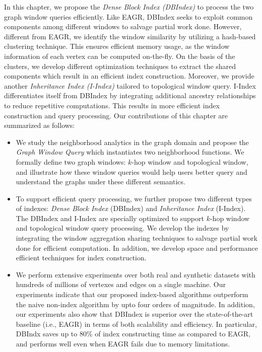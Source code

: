 In this chapter,
we propose the \emph{Dense Block Index (DBIndex)} 
to process the two graph window queries efficiently.
Like EAGR, DBIndex seeks to exploit common
components among different windows to salvage 
partial work done. However, different from EAGR,
we identify the window similarity by utilizing a hash-based 
clustering technique. This ensures 
efficient memory usage, as the window information of each vertex can 
be computed on-the-fly. On the basis of the clusters, we develop different 
optimization techniques to extract the shared components
which result in an efficient index construction. 
%
Moreover, we provide another \emph{Inheritance Index (I-Index)} tailored 
to topological window query. I-Index differentiates itself from
DBIndex by integrating additional ancestry relationships 
to reduce repetitive computations. This results in 
more efficient index construction and query processing.  
%
Our contributions of this chapter are summarized as follows:
\begin{itemize}
\item{We study the neighborhood analytics in the graph domain and propose the
\emph{Graph Window Query} which instantiates two neighborhood functions.
We formally define two graph windows: $k$-hop window and topological window, 
and illustrate how these window queries would help users better query and
understand the graphs under these different semantics.}

\item{To support efficient query processing, we further propose two different types of indexes: \emph{Dense Block Index} (DBIndex) and \emph{Inheritance Index} (I-Index). The
DBIndex and I-Index are specially 
optimized to support $k$-hop window and topological window query processing. 
We develop the indexes by integrating the window aggregation sharing techniques to salvage partial work done for efficient computation. In addition, we develop space and performance efficient techniques for index construction. 
}

\item{We perform extensive experiments over both real and synthetic datasets
with hundreds of millions of vertexes and edges on a single machine. Our experiments 
indicate that our proposed index-based algorithms outperform the naive non-index
algorithm by upto four orders of magnitude. In addition, our experiments also show 
that DBIndex is superior over the state-of-the-art baseline (i.e., EAGR)
in terms of both scalability and efficiency. 
In particular, DBIndx saves up to 80\% of index constructing time as compared to EAGR, 
and performs well even when EAGR fails due to memory limitations. 
}
\end{itemize}

